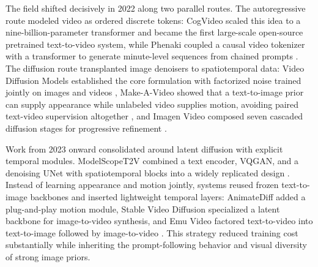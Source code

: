 The field shifted decisively in 2022 along two parallel routes. The autoregressive route modeled video as ordered discrete tokens: CogVideo scaled this idea to a nine-billion-parameter transformer and became the first large-scale open-source pretrained text-to-video system, while Phenaki coupled a causal video tokenizer with a transformer to generate minute-level sequences from chained prompts \cite{hong2022cogvideo,villegas2022phenaki}. The diffusion route transplanted image denoisers to spatiotemporal data: Video Diffusion Models established the core formulation with factorized noise trained jointly on images and videos \cite{ho2022videodiffusion}, Make-A-Video showed that a text-to-image prior can supply appearance while unlabeled video supplies motion, avoiding paired text-video supervision altogether \cite{singer2022makeavideo}, and Imagen Video composed seven cascaded diffusion stages for progressive refinement \cite{ho2022imagenvideo}.

Work from 2023 onward consolidated around latent diffusion with explicit temporal modules. ModelScopeT2V combined a text encoder, VQGAN, and a denoising UNet with spatiotemporal blocks into a widely replicated design \cite{modelscope2023}. Instead of learning appearance and motion jointly, systems reused frozen text-to-image backbones and inserted lightweight temporal layers: AnimateDiff added a plug-and-play motion module, Stable Video Diffusion specialized a latent backbone for image-to-video synthesis, and Emu Video factored text-to-video into text-to-image followed by image-to-video \cite{guo2023animatediff,blattmann2024svd,he2022emuvideofactorizing}. This strategy reduced training cost substantially while inheriting the prompt-following behavior and visual diversity of strong image priors.

